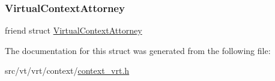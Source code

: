 \subsubsection{\texorpdfstring{Virtual\+Context\+Attorney}{VirtualContextAttorney}}
{\footnotesize\ttfamily friend struct \hyperlink{structvt_1_1vrt_1_1_virtual_context_attorney}{Virtual\+Context\+Attorney}\hspace{0.3cm}{\ttfamily [friend]}}



The documentation for this struct was generated from the following file\+:\begin{DoxyCompactItemize}
\item 
src/vt/vrt/context/\hyperlink{context__vrt_8h}{context\+\_\+vrt.\+h}\end{DoxyCompactItemize}
